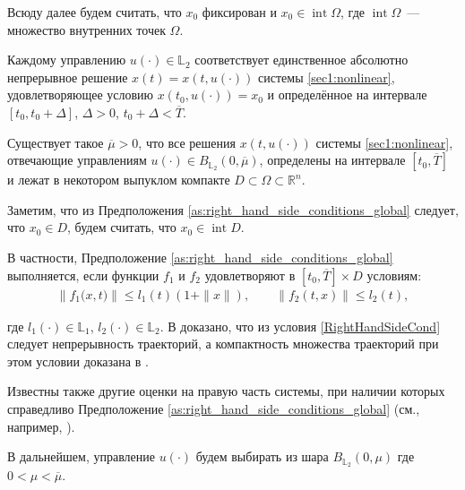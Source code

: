\documentclass[../main.tex]{subfiles}
\begin{document}
	Всюду далее будем считать, что $x_0$ фиксирован и  $x_0 \in \operatorname{int} \Omega $, где $\operatorname{int} \Omega $~--- множество внутренних точек $\Omega$. 
	
	Каждому управлению $ u(\cdot) \in \mathbb{L}_2 $ соответствует единственное абсолютно непрерывное решение $ x(t)=x(t,u(\cdot)) $ системы \eqref{sec1:nonlinear}, удовлетворяющее условию $ x(t_0, u(\cdot)) = x_0$ и определённое на интервале $ [t_0, t_0 + \Delta] $, $\Delta > 0$, $ t_0 + \Delta < \overline{T}$.

	\begin{assumption}\label{as:right_hand_side_conditions_global}
		Существует такое $\overline{\mu} > 0 $, что все решения $ x(t, u(\cdot)) $ системы \eqref{sec1:nonlinear}, отвечающие управлениям $u(\cdot) \in B_{\mathbb{L}_2}(0,\overline{\mu})$,  определены на интервале $ [t_0,\overline{T}] $ и лежат в некотором выпуклом компакте $D \subset \Omega \subset \mathbb{R}^n$. 
	\end{assumption}
	
	Заметим, что из Предположения  \ref{as:right_hand_side_conditions_global} следует, что $x_0 \in D$, будем считать, что $x_0 \in \operatorname{int} D$.

	В частности, Предположение \ref{as:right_hand_side_conditions_global} выполняется, если  функции $f_1$ и $f_2$ удовлетворяют в $ [t_0, \overline{T}] \times D$ условиям:
	\begin{gather}\label{RightHandSideCond}
		\left\|f_1\big(x,t\big) \right\| \leqslant l_1(t) (1 + \|x\|), \qquad  \left\| f_2(t,x) \right\| \leqslant l_2(t), 
	\end{gather}
	
	где $ l_1(\cdot) \in  \mathbb{L}_1$, $ l_2(\cdot) \in  \mathbb{L}_2$. В \cite[Теорема 5]{Fillipov2} доказано, что из условия \eqref{RightHandSideCond} следует непрерывность траекторий, а компактность множества траекторий при этом условии доказана в \cite[Утверждение 2]{GusZyk}.
	
	Известны также другие  оценки на правую часть системы, при наличии которых справедливо Предположение  \ref{as:right_hand_side_conditions_global} (см., например, \cite{Fillipov2, Guseinov}).
	
	В дальнейшем, управление $ u(\cdot) $ будем выбирать из шара $ B_{\mathbb{L}_2}(0,\mu) $ где $ 0 < \mu < \overline{\mu} $.
	
\end{document}
